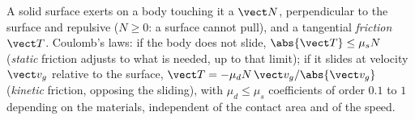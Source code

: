 \begin{proposition}\label{prop:b1:newton-dynamics:friction}
A solid surface exerts on a body touching it a \emph{}
$\vect N$, perpendicular to the surface and repulsive ($N \geq 0$: a
surface cannot pull), and a tangential \emph{friction } $\vect T$.
Coulomb's laws: if the body does not slide, $\abs{\vect T} \leq \mu_s N$
(\emph{static} friction adjusts to what is needed, up to that limit);
if it slides at velocity $\vect v_g$ relative to the surface,
$\vect T = -\mu_d N\,\vect v_g/\abs{\vect v_g}$ (\emph{kinetic} friction,
opposing the sliding), with $\mu_d \leq \mu_s$ coefficients of order
$0.1$ to $1$ depending on the materials, independent of the contact
area and of the speed.
\end{proposition}
\admitted

